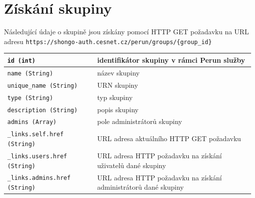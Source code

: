 \documentclass[
  printed, %
  twoside, %
  table,   %
  nolof,     %
  nolot,     %
]{fithesis3}
\begin{document}
\section{Získání skupiny}
Následující údaje o skupině jsou získány pomocí HTTP GET požadavku na URL adresu \texttt{https://shongo-auth.cesnet.cz/perun/groups/\{group\_id\}}

\label{table:perunws:group}
\begin{table}[h]
\begin{tabular}{|l|l|}
\hline
\texttt{id (int)}                       & \parbox[t]{6cm}{identifikátor skupiny v rámci Perun služby}  \\ \hline
\texttt{name (String)}                  & název skupiny  \\ \hline
\texttt{unique\_name (String)}          & URN skupiny  \\ \hline
\texttt{type (String)}                  &  typ skupiny \\ \hline
\texttt{description (String)}           & popis skupiny  \\ \hline
\texttt{admins (Array)}                 & pole administrátorů skupiny  \\ \hline
\texttt{\_links.self.href (String)}     & \parbox[t]{6cm}{URL adresa aktuálního HTTP GET požadavku}  \\ \hline
\texttt{\_links.users.href (String)}    & \parbox[t]{6cm}{URL adresa HTTP požadavku na získání uživatelů dané skupiny}  \\ \hline
\texttt{\_links.admins.href (String)}   & \parbox[t]{6cm}{URL adresa HTTP požadavku na získání administrátorů dané skupiny}  \\ \hline


\end{tabular}
\end{table}
\end{document}
